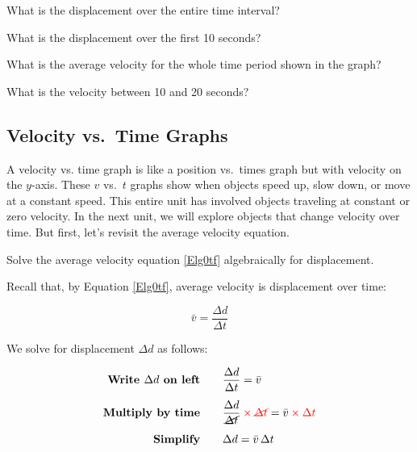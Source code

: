 \documentclass[main.tex]{subfiles}
\begin{document}
\begin{exercise} \label{5Wd4QG}
    What is the displacement over the entire time interval?
\end{exercise}


\begin{exercise} \label{OselF0}
   What is the displacement over the first 10 seconds? 
\end{exercise}


\begin{exercise} \label{ZRQnM6}
    What is the average velocity for the whole time period shown in the graph?
\end{exercise}

\begin{exercise} \label{fZtSlq}
    What is the velocity between 10 and 20 seconds?
\end{exercise}






\cyanhrule

\subsection{Velocity vs.~Time Graphs} \label{EOqf0D}

A \gls{velocity vs. time graph} is like a position vs.~times graph but with velocity on the $y$-axis. These $v$ vs.~$t$ graphs show when objects speed up, slow down, or move at a constant speed. This entire unit has involved objects traveling at constant or zero velocity. In the next unit, we will explore objects that change velocity over time. But first, let's revisit the average velocity equation.

\begin{example}
    Solve the average velocity equation \eqref{Elg0tf} algebraically for displacement.
\end{example}

\Solution Recall that, by Equation \eqref{Elg0tf}, average velocity is displacement over time:

\begin{equation*}
    \bar{v} = \frac{\Delta{d}}{\Delta{t}}
\end{equation*}

We solve for displacement $\Delta{d}$ as follows:

\begin{align*}
    \textbf{Write $\Delta{d}$ on left} \qquad & \frac{\Delta{d}}{\Delta{t}} = \bar{v}\\[1ex]
    \textbf{Multiply by time} \qquad & \frac{\Delta{d}}{\cancel{\Delta{t}}} \mathbin{\color{red} \times} \textcolor{red}{\cancel{\Delta{t}}} = \bar{v} \mathbin{\color{red} \times} \textcolor{red}{\Delta{t}}\\[1ex]
    \textbf{Simplify} \qquad & \Delta{d} = \bar{v}\,\Delta{t}
\end{align*}
\end{document}
